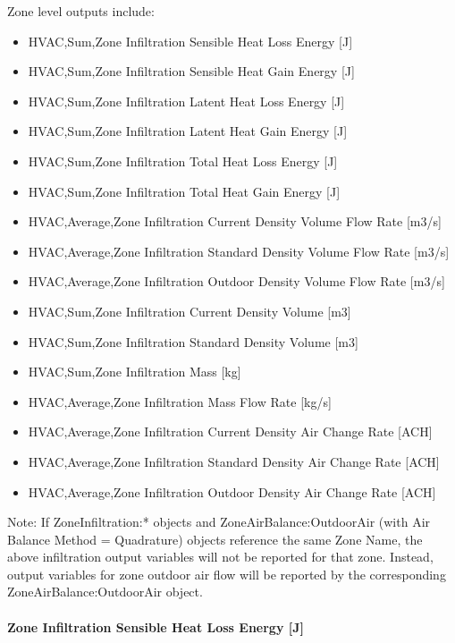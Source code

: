 Zone level outputs include:

\begin{itemize}
\item
  HVAC,Sum,Zone Infiltration Sensible Heat Loss Energy {[}J{]}
\item
  HVAC,Sum,Zone Infiltration Sensible Heat Gain Energy {[}J{]}
\item
  HVAC,Sum,Zone Infiltration Latent Heat Loss Energy {[}J{]}
\item
  HVAC,Sum,Zone Infiltration Latent Heat Gain Energy {[}J{]}
\item
  HVAC,Sum,Zone Infiltration Total Heat Loss Energy {[}J{]}
\item
  HVAC,Sum,Zone Infiltration Total Heat Gain Energy {[}J{]}
\item
  HVAC,Average,Zone Infiltration Current Density Volume Flow Rate {[}m3/s{]}
\item
  HVAC,Average,Zone Infiltration Standard Density Volume Flow Rate {[}m3/s{]}
\item
  HVAC,Average,Zone Infiltration Outdoor Density Volume Flow Rate {[}m3/s{]}
\item
  HVAC,Sum,Zone Infiltration Current Density Volume {[}m3{]}
\item
  HVAC,Sum,Zone Infiltration Standard Density Volume {[}m3{]}
\item
  HVAC,Sum,Zone Infiltration Mass {[}kg{]}
\item
  HVAC,Average,Zone Infiltration Mass Flow Rate {[}kg/s{]}
\item
  HVAC,Average,Zone Infiltration Current Density Air Change Rate {[}ACH{]}
\item
  HVAC,Average,Zone Infiltration Standard Density Air Change Rate {[}ACH{]}
\item
  HVAC,Average,Zone Infiltration Outdoor Density Air Change Rate {[}ACH{]}
\end{itemize}

Note: If ZoneInfiltration:* objects and ZoneAirBalance:OutdoorAir (with Air Balance Method = Quadrature) objects reference the same Zone Name, the above infiltration output variables will not be reported for that zone. Instead, output variables for zone outdoor air flow will be reported by the corresponding ZoneAirBalance:OutdoorAir object.

\paragraph{Zone Infiltration Sensible Heat Loss Energy {[}J{]}}\label{zone-infiltration-sensible-heat-loss-energy-j}

